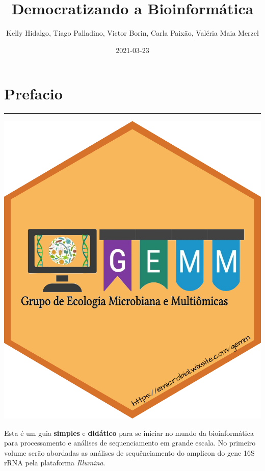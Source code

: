 \documentclass[
]{book}
\title{ Democratizando a Bioinformática}
\author{Kelly Hidalgo, Tiago Palladino, Victor Borin, Carla Paixão, Valéria Maia Merzel}
\date{2021-03-23}
\begin{document}
\maketitle

{
\setcounter{tocdepth}{1}
\tableofcontents
}
\hypertarget{prefacio}{%
\chapter*{Prefacio}\label{prefacio}}

\begin{center}\rule{0.5\linewidth}{0.5pt}\end{center}

\begin{center}\includegraphics[width=1.2\linewidth,height=1.2\textheight]{imgs/1} \end{center}

Esta é um guia \textbf{simples} e \textbf{didático} para se iniciar no mundo da bioinformática para processamento e análises de sequenciamento em grande escala. No primeiro volume serão abordadas as análises de sequênciamento do amplicon do gene 16S rRNA pela plataforma \emph{Illumina}.
\end{document}
